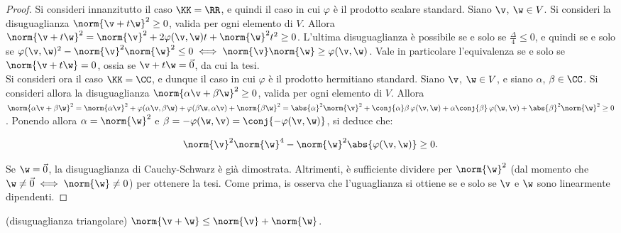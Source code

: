 \documentclass[11pt]{article}
\begin{document}
	\begin{proof}
		Si consideri innanzitutto il caso $\KK = \RR$, e quindi il caso in cui $\varphi$ è
		il prodotto scalare standard. Siano $\v$, $\w \in V$.
		Si consideri la disuguaglianza $\norm{\v + t\w}^2 \geq 0$, valida
		per ogni elemento di $V$. Allora $\norm{\v + t \w}^2 = \norm{\v}^2 + 2 \varphi(\v, \w) t + \norm{\w}^2 t^2 \geq 0$. L'ultima disuguaglianza è possibile se e solo se $\frac{\Delta}{4} \leq 0$, e quindi se e solo
		se $\varphi(\v, \w)^2 - \norm{\v}^2 \norm{\w}^2 \leq 0 \iff \norm{\v} \norm{\w} \geq \varphi(\v, \w)$.
		Vale in particolare l'equivalenza se e solo se $\norm{\v + t\w} = 0$, ossia se $\v + t\w = \vec 0$, da cui
		la tesi. \\
		
		Si consideri ora il caso $\KK = \CC$, e dunque il caso in cui $\varphi$ è il prodotto hermitiano
		standard. Siano $\v$, $\w \in V$, e siano $\alpha$, $\beta \in \CC$. Si consideri allora
		la disuguaglianza $\norm{\alpha \v + \beta \w}^2 \geq 0$, valida per ogni elemento di $V$. Allora
		$\norm{\alpha \v + \beta \w}^2 = \norm{\alpha \v}^2 + \varphi(\alpha \v, \beta \w) + \varphi(\beta \w, \alpha \v) + \norm{\beta \w}^2 = \abs{\alpha}^2 \norm{\v}^2 + \conj{\alpha} \beta \, \varphi(\v, \w) +
		\alpha \conj{\beta} \, \varphi(\w, \v) + \abs{\beta}^2 \norm{\w}^2 \geq 0$. Ponendo allora
		$\alpha = \norm{\w}^2$ e $\beta = -\varphi(\w, \v) = \conj{-\varphi(\v, \w)}$, si deduce che:
		
		\[ \norm{\v}^2 \norm{\w}^4 - \norm{\w}^2 \abs{\varphi(\v, \w)} \geq 0. \]
		
		\vskip 0.05in
		
		Se $\w = \vec 0$, la disuguaglianza di Cauchy-Schwarz è già dimostrata. Altrimenti, è sufficiente
		dividere per $\norm{\w}^2$ (dal momento che $\w \neq \vec 0 \iff \norm{\w} \neq 0$) per ottenere
		la tesi. Come prima, is osserva che l'uguaglianza si ottiene se e solo se $\v$ e $\w$ sono
		linearmente dipendenti.
	\end{proof}

	\begin{proposition} (disuguaglianza triangolare)
		$\norm{\v + \w} \leq \norm{\v} + \norm{\w}$.
	\end{proposition}
\end{document}
